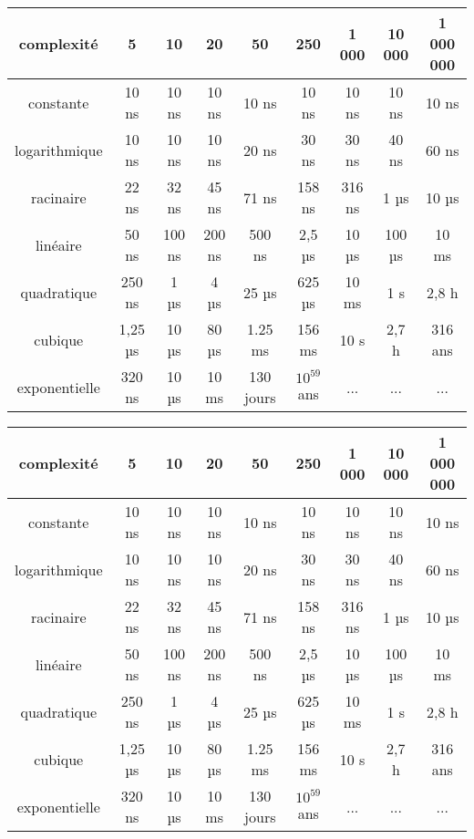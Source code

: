 \documentclass[a4paper,12pt,french]{article}
\begin{document}
\begin{center}
\begin{tabular}{|c|c|c|c|c|c|c|c|c|}
\hline
\rowcolor{UGLiOrange}\textbf{\color{white}complexité} & \textbf{\color{white}5} & \textbf{\color{white}10} & \textbf{\color{white}20} & \textbf{\color{white}50} & \textbf{\color{white}250} & \textbf{\color{white}1 000} & \textbf{\color{white}10 000} & \textbf{\color{white}1 000 000} \\
\hline
constante & 10 ns & 10 ns & 10 ns & 10 ns & 10 ns & 10 ns & 10 ns & 10 ns \\
\hline
\rowcolor{blue!10}logarithmique & 10 ns & 10 ns & 10 ns & 20 ns  & 30 ns & 30 ns & 40 ns & 60 ns \\
\hline
racinaire & 22 ns & 32 ns & 45 ns & 71 ns & 158 ns & 316 ns & 1 µs & 10 µs \\
\hline
\rowcolor{blue!10}linéaire & 50 ns & 100 ns & 200 ns & 500 ns & 2,5 µs & 10 µs & 100 µs & 10 ms \\
\hline
quadratique & 250 ns & 1 µs & 4 µs & 25 µs & 625 µs & 10 ms & 1 s & 2,8 h \\
\hline
\rowcolor{blue!10}cubique & 1,25 µs & 10 µs & 80 µs & 1.25 ms & 156 ms & 10 s & 2,7 h & 316 ans \\
\hline
exponentielle & 320 ns & 10 µs & 10 ms & 130 jours & $10^{59}$ ans & ... & ... & ... \\
\hline
\end{tabular}
\end{center}
\begin{center}
\begin{tabular}{|c|c|c|c|c|c|c|c|c|}
\hline
\rowcolor{UGLiOrange}\textbf{\color{white}complexité} & \textbf{\color{white}5} & \textbf{\color{white}10} & \textbf{\color{white}20} & \textbf{\color{white}50} & \textbf{\color{white}250} & \textbf{\color{white}1 000} & \textbf{\color{white}10 000} & \textbf{\color{white}1 000 000} \\
\hline
constante & 10 ns & 10 ns & 10 ns & 10 ns & 10 ns & 10 ns & 10 ns & 10 ns \\
\hline
\rowcolor{blue!10}logarithmique & 10 ns & 10 ns & 10 ns & 20 ns  & 30 ns & 30 ns & 40 ns & 60 ns \\
\hline
racinaire & 22 ns & 32 ns & 45 ns & 71 ns & 158 ns & 316 ns & 1 µs & 10 µs \\
\hline
\rowcolor{blue!10}linéaire & 50 ns & 100 ns & 200 ns & 500 ns & 2,5 µs & 10 µs & 100 µs & 10 ms \\
\hline
quadratique & 250 ns & 1 µs & 4 µs & 25 µs & 625 µs & 10 ms & 1 s & 2,8 h \\
\hline
\rowcolor{blue!10}cubique & 1,25 µs & 10 µs & 80 µs & 1.25 ms & 156 ms & 10 s & 2,7 h & 316 ans \\
\hline
exponentielle & 320 ns & 10 µs & 10 ms & 130 jours & $10^{59}$ ans & ... & ... & ... \\
\hline
\end{tabular}
\end{center}
\end{document}
